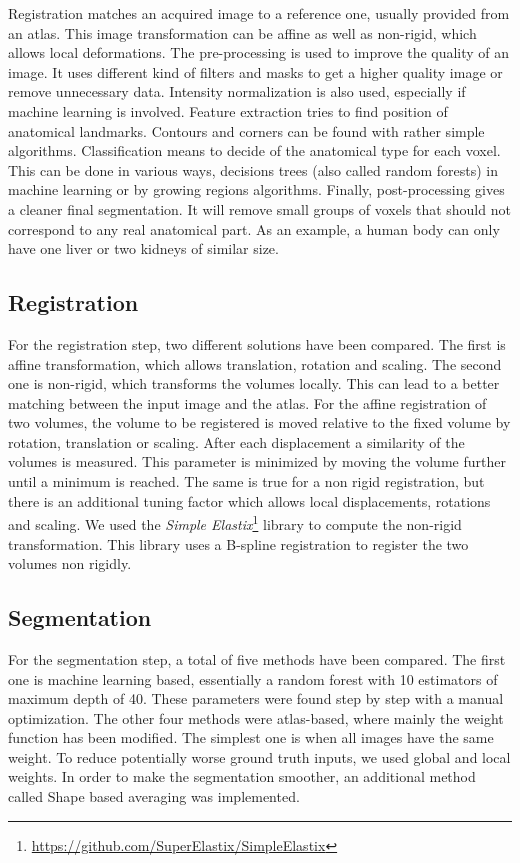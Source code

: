 Registration matches an acquired image to a reference one, usually provided from an atlas. This image transformation can be affine as well as non-rigid, which allows local deformations. The pre-processing is used to improve the quality of an image. It uses different kind of filters and masks to get a higher quality image or remove unnecessary data. Intensity normalization is also used, especially if machine learning is involved. Feature extraction tries to find position of anatomical landmarks. Contours and corners can be found with rather simple algorithms. Classification means to decide of the anatomical type for each voxel. This can be done in various ways, decisions trees (also called random forests) in machine learning or by growing regions algorithms. Finally, post-processing gives a cleaner final segmentation. It will remove small groups of voxels that should not correspond to any real anatomical part. As an example, a human body can only have one liver or two kidneys of similar size.

\subsection*{Registration}
For the registration step, two different solutions have been compared. The first is affine transformation, which allows translation, rotation and scaling. The second one is non-rigid, which transforms the volumes locally. This can lead to a better matching between the input image and the atlas. For the affine registration of two volumes, the volume to be registered is moved relative to the fixed volume by rotation, translation or scaling. After each displacement a similarity of the volumes is measured. This parameter is minimized by moving the volume further until a minimum is reached. The same is true for a non rigid registration, but there is an additional tuning factor which allows local displacements, rotations and scaling. We used the \textit{Simple Elastix}\footnote{\url{https://github.com/SuperElastix/SimpleElastix}} library to compute the non-rigid transformation. This library uses a B-spline registration to register the two volumes non rigidly.

\subsection*{Segmentation}
For the segmentation step, a total of five methods have been compared. The first one is machine learning based, essentially a random forest with 10 estimators of maximum depth of 40. These parameters were found step by step with a manual optimization. The other four methods were atlas-based, where mainly the weight function has been modified. The simplest one is when all images have the same weight. To reduce potentially worse ground truth inputs, we used global and local weights. In order to make the segmentation smoother, an additional method called Shape based averaging was implemented.

